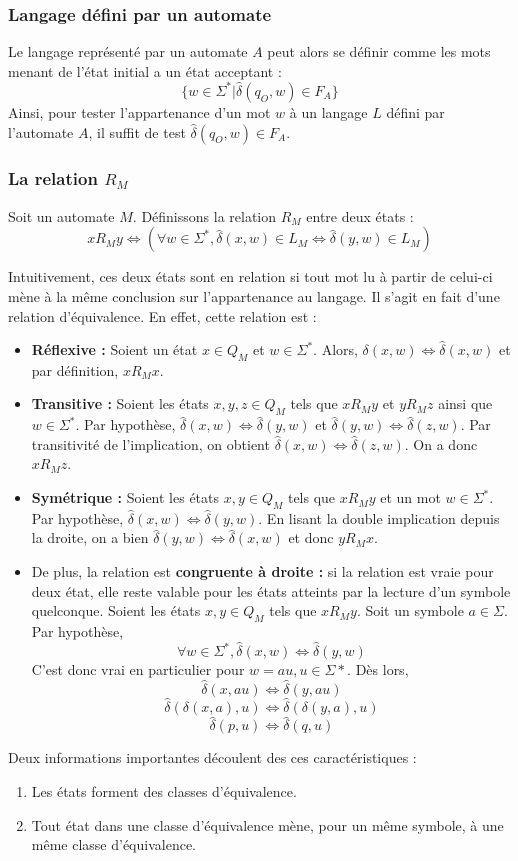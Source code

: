 	 \subsubsection{Langage défini par un automate}
	 
	 Le langage représenté par un automate $A$ peut alors se définir comme les mots menant de l'état initial a un état acceptant :
	 $$
	 \{w \in \Sigma^* | \hat{\delta}(q_O,w) \in F_A\}
	 $$
	 Ainsi, pour tester l'appartenance d'un mot $w$ à un langage $L$ défini par l'automate $A$, il suffit de test $\hat{\delta}(q_O,w) \in F_A$.
	 
	 \subsubsection{La relation $R_M$}\label{ss:rm}
	 
	 Soit un automate $M$. Définissons la relation $R_M$ entre deux états : $$xR_My \iff (\forall w \in \Sigma^*, \hat{\delta}(x,w) \in L_M \iff \hat{\delta}(y,w) \in L_M)$$
	 
	 Intuitivement, ces deux états sont en relation si tout mot lu à partir de celui-ci mène à la même conclusion sur l'appartenance au langage. Il s'agit en fait d'une relation d'équivalence. En effet, cette relation est :
	 
	 \begin{itemize}
	 	\item \textbf{Réflexive :} Soient un état $x \in Q_M$ et $w \in \Sigma^*$. Alors, $\delta(x,w) \iff \hat{\delta}(x,w)$ et par définition, $xR_Mx$.
	 	\item \textbf{Transitive :} Soient les états $x,y,z \in Q_M$ tels que $xR_My$ et $yR_Mz$ ainsi que $w \in \Sigma^*$. Par hypothèse, $\hat{\delta}(x,w) \iff \hat{\delta}(y,w)$ et $\hat{\delta}(y,w) \iff \hat{\delta}(z,w)$. Par transitivité de l'implication, on obtient $\hat{\delta}(x,w) \iff \hat{\delta}(z,w)$. On a donc $xR_Mz$.
	 	\item \textbf{Symétrique : } Soient les états $x,y \in Q_M$ tels que $xR_My$ et un mot $w \in \Sigma^*$. Par hypothèse, $\hat{\delta}(x, w) \iff \hat{\delta}(y, w)$. En lisant la double implication depuis la droite, on a bien $\hat{\delta}(y, w) \iff \hat{\delta}(x, w)$ et donc $yR_Mx$.
	 	\item De plus, la relation est \textbf{congruente à droite :} si la relation est vraie pour deux état, elle reste valable pour les états atteints par la lecture d'un symbole quelconque. Soient les états $x,y \in Q_M$ tels que $xR_My$. Soit un symbole $a \in \Sigma$. Par hypothèse, $$\forall w \in \Sigma^*, \hat{\delta}(x, w) \iff \hat{\delta}(y, w)$$
	 	C'est donc vrai en particulier pour $w = au, u \in \Sigma*$. Dès lors,
	 	$$\hat{\delta}(x, au) \iff \hat{\delta}(y, au)$$
	 	$$\hat{\delta}(\delta(x,a),u) \iff\hat{\delta}(\delta(y,a),u)$$
	 	$$\hat{\delta}(p,u) \iff \hat{\delta}(q,u)$$
	 \end{itemize}
	 
	 Deux informations importantes découlent des ces caractéristiques : 
	 \begin{enumerate}
	 	\item Les états forment des classes d'équivalence.
	 	\item Tout état dans une classe d'équivalence mène, pour un même symbole, à une même classe d'équivalence.
	 \end{enumerate}
	 
	 